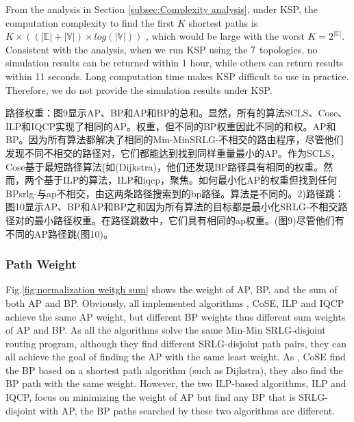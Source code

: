 From the analysis in Section \ref{subsec:Complexity analysis}, under KSP, the computation complexity to find the first $K$ shortest paths is $K\times ((|\mathbb{E}|+|\mathbb{V}|)\times log(|\mathbb{V}|))$ , which would be large with the worst $K=2^{|\mathbb{E}|}$.
 Consistent with the analysis, when we run KSP using the $7$ topologies, no simulation results can be returned within 1 hour, while others can return results within 11 seconds. Long computation time makes KSP difficult to use in practice. Therefore, we do not provide the simulation results under KSP.

路径权重：图9显示AP、BP和AP和BP的总和。显然，所有的算法SCLS、Cose、ILP和IQCP实现了相同的AP。权重，但不同的BP权重因此不同的和权。AP和BP。因为所有算法都解决了相同的Min-MinSRLG-不相交的路由程序，尽管他们发现不同不相交的路径对，它们都能达到找到同样重量最小的AP。作为SCLS，Cose基于最短路径算法(如(Dijkstra)，他们还发现BP路径具有相同的权重。然而，两个基于ILP的算法，ILP和iqcp，聚焦。如何最小化AP的权重但找到任何BPsrlg-与ap不相交，由这两条路径搜索到的bp路径。算法是不同的。2)路径跳：图10显示AP、BP和AP和BP之和因为所有算法的目标都是最小化SRLG-不相交路径对的最小路径权重。在路径跳数中，它们具有相同的ap权重。(图9)尽管他们有不同的AP路径跳(图10)。

\subsubsection{Path Weight}
Fig.\ref{fig:normalization weitgh sum} shows the weight of AP, BP, and the sum of both AP and BP. Obviously, all implemented algorithms \CI, CoSE, ILP and IQCP achieve the same AP weight, but different BP weights thus different sum weights of AP and BP. As all the algorithms solve the same Min-Min SRLG-disjoint routing program, although they find different SRLG-disjoint path pairs, they can all achieve the goal of finding the  AP with the same least weight.
As \CI, CoSE find the  BP based on a shortest path algorithm (such as Dijkstra), they also find the BP path with the same weight. However, the two ILP-based algorithms, ILP and IQCP, focus on minimizing the weight of AP but find any BP that is SRLG-disjoint with AP, the BP paths searched by these two algorithms are different.

